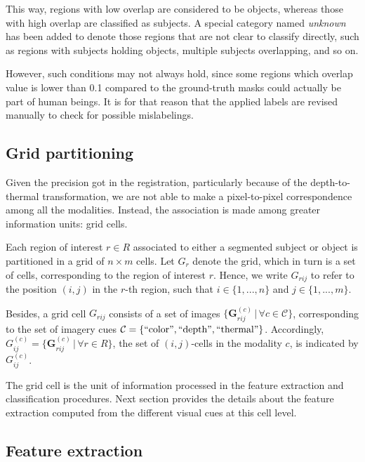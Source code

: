 \documentclass[10pt,twocolumn,letterpaper]{article}
\begin{document}
This way, regions with low overlap are considered to be objects, whereas those with high overlap are classified as subjects. A special category named \emph{unknown} has been added to denote those regions that are not clear to classify directly, such as regions with subjects holding objects, multiple subjects overlapping, and so on. 

However, such conditions may not always hold, since some regions which overlap value is lower than 0.1 compared to the ground-truth masks could actually be part of human beings. It is for that reason that the applied labels are revised manually to check for possible mislabelings.

\subsection{Grid partitioning}
\label{ssec:gridpartitioning}

Given the precision got in the registration, particularly because of the depth-to-thermal transformation, we are not able to make a pixel-to-pixel correspondence among all the modalities. Instead, the association is made among greater information units: grid cells. 

Each region of interest $r \in R$ associated to either a segmented subject or object is partitioned in a grid of $n \times m$ cells. Let $G_r$ denote the grid, which in turn is a set of cells, corresponding to the region of interest $r$. Hence, we write $G_{rij}$ to refer to the position $(i,j)$ in the $r$-th region, such that $i \in \{ 1,...,n \}$ and $j \in \{ 1,...,m \}$. 

Besides, a grid cell $G_{rij}$ consists of a set of images $\{\mathbf{G}_{rij}^{(c)} \,|\, \forall{c} \in \mathcal{C}\}$, corresponding to the set of imagery cues $\mathcal{C} = \{\mathrm{``color"}, \mathrm{``depth"}, \mathrm{``thermal"}\}$. Accordingly, $G_{ij}^{(c)} = \{\mathbf{G}_{rij}^{(c)} \,|\, \forall r \in R\}$, the set of $(i,j)$-cells in the modality $c$, is indicated by $G_{ij}^{(c)}$.

The grid cell is the unit of information processed in the feature extraction and classification procedures. Next section provides the details about the feature extraction computed from the different visual cues at this cell level.

\subsection{Feature extraction}
\label{ssec:feature extraction}
\end{document}
